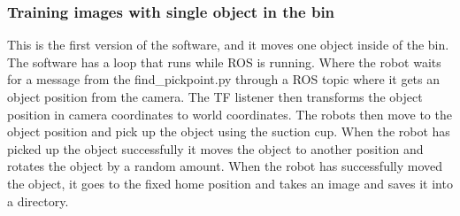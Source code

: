 \subsubsection{Training images with single object in the bin}\label{robotcontrol}
This is the first version of the software, and it moves one object inside of the bin. The software has a loop that runs while ROS is running. 
Where the robot waits for a message from the find\_pickpoint.py through a ROS topic where it gets an object position from the camera.
The TF listener then transforms the object position in camera coordinates to world coordinates. The robots then move to the object position and pick up the object using the suction cup. When the robot has picked up the object successfully it moves the object to another position and rotates the object by a random amount. When the robot has successfully moved the object, it goes to the fixed home position and takes an image and saves it into a directory. 

